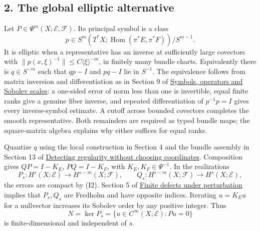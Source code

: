 \documentclass[
  11pt,
]{article}
\makeatletter
\let\ReaderOriginalAnchorStart\hyper@anchorstart
\let\ReaderOriginalAnchorEnd\hyper@anchorend
\let\ReaderPendingAliases\@empty
\def\ReaderArmAliases#1{\gdef\ReaderPendingAliases{#1}}
\def\hyper@anchorstart#1{\ReaderIfNativeAnchorTF{#1}{\ReaderPendingAliases\global\let\ReaderPendingAliases\@empty}{}\ReaderOriginalAnchorStart{#1}}
\makeatother
\begin{document}
\ReaderArmAliases{\ReaderOriginalAnchorStart{AN03-GSI-002}\ReaderOriginalAnchorEnd\begingroup\expandafter\def\csname @currentHref\endcsname{AN03-GSI-002}\label{AN03-GSI-002}\endgroup\ReaderOriginalAnchorStart{an03-gsi-002-the-global-elliptic-alternative}\ReaderOriginalAnchorEnd\begingroup\expandafter\def\csname @currentHref\endcsname{an03-gsi-002-the-global-elliptic-alternative}\label{an03-gsi-002-the-global-elliptic-alternative}\endgroup\ReaderOriginalAnchorStart{2-the-global-elliptic-alternative}\ReaderOriginalAnchorEnd\begingroup\expandafter\def\csname @currentHref\endcsname{2-the-global-elliptic-alternative}\label{2-the-global-elliptic-alternative}\endgroup}
\subsection{2. The global elliptic
alternative}\label{the-global-elliptic-alternative}

Let \(P\in\Psi^m(X;\mathcal E,\mathcal F)\). Its principal symbol is a
class \[
p\in S^m(T^*X;\operatorname{Hom}(\pi^*E,\pi^*F))/S^{m-1}.
\tag{I3}
\] It is elliptic when a representative has an inverse at sufficiently
large covectors with \(\|p(x,\xi)^{-1}\|\leq C\langle\xi\rangle^{-m}\),
in finitely many bundle charts. Equivalently there is \(q\in S^{-m}\)
such that \(qp-I\) and \(pq-I\) lie in \(S^{-1}\). The equivalence
follows from matrix inversion and differentiation as in Section 9 of
\href{euclidean-symbol-calculus.pdf}{Symbols, operators and Sobolev
scales}: a one-sided error of norm less than one is invertible, equal
finite ranks give a genuine fiber inverse, and repeated differentiation
of \(p^{-1}p=I\) gives every inverse-symbol estimate. A cutoff across
bounded covectors completes the smooth representative. Both remainders
are required as typed bundle maps; the square-matrix algebra explains
why either suffices for equal ranks.

Quantize \(q\) using the local construction in Section 4 and the bundle
assembly in Section 13 of
\href{geometric-microlocal-calculus.pdf}{Detecting regularity without
choosing coordinates}. Composition gives \(QP=I-K_E\), \(PQ=I-K_F\),
with \(K_E,K_F\in\Psi^{-1}\). In the realizations \[
P_s:H^s(X;\mathcal E)\longrightarrow H^{s-m}(X;\mathcal F),
\qquad
Q_s:H^{s-m}(X;\mathcal F)\longrightarrow H^s(X;\mathcal E),
\tag{I4}
\] the errors are compact by (I2). Section 5 of
\href{fredholm-stability.pdf}{Finite defects under perturbation} implies
that \(P_s,Q_s\) are Fredholm and have opposite indices. Iterating
\(u=K_Eu\) for a nullvector increases its Sobolev order by any positive
integer. Thus \[
N=\ker P_s=\{u\in C^\infty(X;\mathcal E):Pu=0\}
\tag{I5}
\] is finite-dimensional and independent of \(s\).
\end{document}
